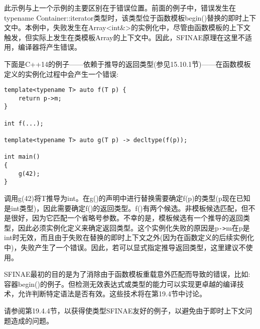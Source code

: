 此示例与上一个示例的主要区别在于错误位置。前面的例子中，错误发生在typename Container::iterator类型时，该类型位于函数模板begin()替换的即时上下文中。本例中，失败发生在Array<int\&>的实例化中，尽管由函数模板的上下文触发，但实际上发生在类模板Array的上下文中。因此，SFINAE原理在这里不适用，编译器将产生错误。

下面是C++14的例子——依赖于推导的返回类型(参见15.10.1节)——在函数模板定义的实例化过程中会产生一个错误:

\begin{lstlisting}[style=styleCXX]
template<typename T> auto f(T p) {
	return p->m;
}

int f(...);

template<typename T> auto g(T p) -> decltype(f(p));

int main()
{
	g(42);
}
\end{lstlisting}

调用g(42)将T推导为int。在g()的声明中进行替换需要确定f(p)的类型(p现在已知是int类型)，因此需要确定f()的返回类型。f()有两个候选。非模板候选匹配，但不是很好，因为它匹配一个省略号参数。不幸的是，模板候选有一个推导的返回类型，因此必须实例化定义来确定返回类型。这个实例化失败的原因是p\texttt{->}m在p是int时无效，而且由于失败在替换的即时上下文之外(因为在函数定义的后续实例化中)，失败产生了一个错误。因此，若可以显式指定推导返回类型，这里建议不使用。

SFINAE最初的目的是为了消除由于函数模板重载意外匹配而导致的错误，比如:容器begin()的例子。但检测无效表达式或类型的能力可以实现更卓越的编译技术，允许判断特定语法是否有效。这些技术将在第19.4节中讨论。

请参阅第19.4.4节，以获得使类型SFINAE友好的例子，以避免由于即时上下文问题造成的问题。



